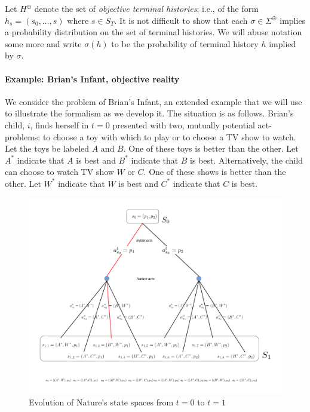 \documentclass[
11pt,
titlepage,
reqno,
]{article}%
\theoremstyle{definition}
\begin{document}
Let $H^\oplus$ denote the set of  \textit{objective terminal histories}; i.e., of the form $h_s=(s_0,\ldots,s)$ where $s\in S_T$.
It is not difficult to show that each $\sigma\in\Sigma^\oplus$ implies a probability distribution on the set of terminal histories.
We will abuse notation some more and write $\sigma(h)$ to be the probability of terminal history $h$ implied by $\sigma$.
		
\paragraph{Example: Brian's Infant, objective reality}	
We consider the problem of Brian's Infant, an extended example that we will use  to illustrate the formalism as we develop it.
The situation is as follows.
Brian's child, $i$, finds herself in $t=0$ presented with two, mutually potential act-problems: to choose a toy with which to play or to choose a TV show to watch. 
Let the toys be labeled $A$ and $B$. 
One of these toys is better than the other. 
Let $A^\ast$ indicate that $A$ is best and $B^\ast$ indicate that $B$ is best. 
Alternatively, the child can choose to watch TV show $W$ or $C$.
One of these shows is better than the other. 
Let $W^\ast$ indicate that $W$ is best and $C^\ast$ indicate that $C$ is best.


\begin{figure}[h!]
	\centering
	\includegraphics*[page=1,trim = 0in 1in 0in 0in,scale=.6]{Awareness_Diagrams_All}
	\caption{Evolution of Nature's state spaces from $t=0$ to $t=1$\label{Diag: p-01}}%
\end{figure}
\end{document}
